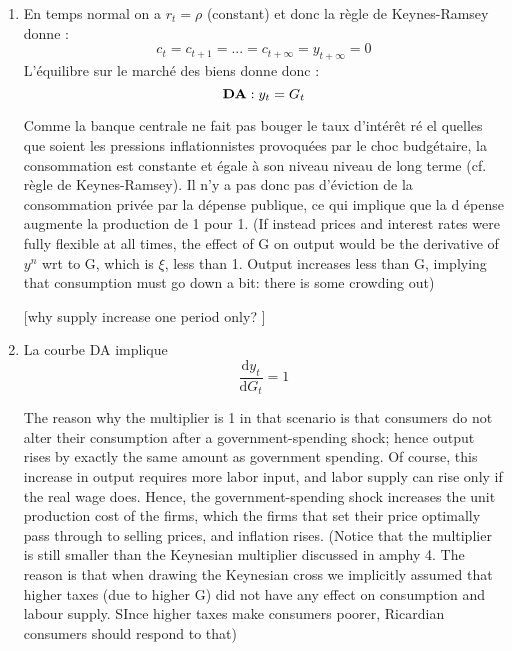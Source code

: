 \documentclass[a4paper,11pt]{article}
\begin{document}
\begin{enumerate}
\item En temps normal on a $r_{t}=\rho $ (constant) et donc la r\`{e}gle de
Keynes-Ramsey donne :%
\begin{equation*}
c_{t}=c_{t+1}=...=c_{t+\infty }=y_{t+\infty }=0
\end{equation*}%
L'\'{e}quilibre sur le march\'{e} des biens donne donc :%
\begin{equation*}
\text{\textbf{DA}}:y_{t}=G_{t}
\end{equation*}%


Comme la banque centrale ne fait pas bouger le taux d'int\'{e}r\^{e}t r\'{e}%
el quelles que soient les pressions inflationnistes provoqu\'{e}es par le
choc budg\'{e}taire, la consommation est constante et \'{e}gale \`{a} son
niveau niveau de long terme (cf. r\`{e}gle de
Keynes-Ramsey). Il n'y a pas donc pas d'\'{e}viction de la
consommation priv\'{e}e par la d\'{e}pense publique, ce qui implique que la d%
\'{e}pense augmente la production de 1 pour 1.  (If instead prices and interest rates were fully flexible at all times, the effect of G on output would be the derivative of $y^n$ wrt to G, which is $\xi$, less than 1. Output increases less than G, implying that consumption must go down a bit: there is some crowding out) 


[why supply increase one period only? ]

\item La courbe DA implique 
\begin{equation*}
\frac{\text{d}y_{t}}{\text{d}G_{t}}=1
\end{equation*}%

The reason why the multiplier is 1 in that scenario is that consumers do not alter their consumption after a government-spending shock; hence output rises by exactly the same amount as government spending.  Of course, this increase in output requires more labor input, and labor supply can rise only if the real wage does. Hence, the government-spending shock increases the unit production cost of the firms, which the firms that set their price optimally pass through to selling prices, and inflation rises. (Notice that the multiplier is still smaller than the Keynesian multiplier discussed in amphy 4. The reason is that when drawing the Keynesian cross  we implicitly assumed that higher taxes (due to higher G) did not have any effect on consumption and labour supply. SInce higher taxes make consumers poorer, Ricardian consumers should respond to that)




\end{enumerate}
\end{document}
